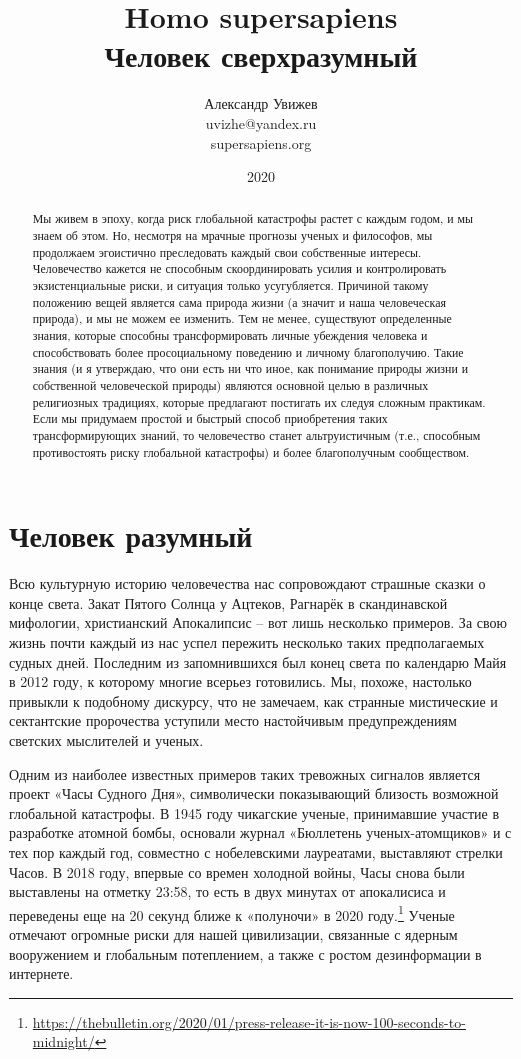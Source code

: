 \documentclass[12pt,a4paper]{report}
\title{%
	\textbf{Homo supersapiens}\\
	\large{Человек сверхразумный}}
\author{Александр Увижев\\
		uvizhe@yandex.ru\\
		supersapiens.org}
\date{2020}
\begin{document}
\maketitle

\begin{abstract}
Мы живем в эпоху, когда риск глобальной катастрофы растет с каждым годом, и мы знаем об этом. Но, несмотря на мрачные прогнозы ученых и философов, мы продолжаем эгоистично преследовать каждый свои собственные интересы. Человечество кажется не способным скоординировать усилия и контролировать экзистенциальные риски, и ситуация только усугубляется. Причиной такому положению вещей является сама природа жизни (а значит и наша человеческая природа), и мы не можем ее изменить. Тем не менее, существуют определенные знания, которые способны трансформировать личные убеждения человека и способствовать более просоциальному поведению и личному благополучию. Такие знания (и я утверждаю, что они есть ни что иное, как понимание природы жизни и собственной человеческой природы) являются основной целью в различных религиозных традициях, которые предлагают постигать их следуя сложным практикам. Если мы придумаем простой и быстрый способ приобретения таких трансформирующих знаний, то человечество станет альтруистичным (т.е., способным противостоять риску глобальной катастрофы) и более благополучным сообществом.
\end{abstract}

\chapter*{Человек разумный}

Всю культурную историю человечества нас сопровождают страшные сказки о конце света. Закат Пятого Солнца у Ацтеков, Рагнарёк в скандинавской мифологии, христианский Апокалипсис -- вот лишь несколько примеров. За свою жизнь почти каждый из нас успел пережить несколько таких предполагаемых судных дней. Последним из запомнившихся был конец света по календарю Майя в 2012 году, к которому многие всерьез готовились. Мы, похоже, настолько привыкли к подобному дискурсу, что не замечаем, как странные мистические и сектантские пророчества уступили место настойчивым предупреждениям светских мыслителей и ученых.

\noindent Одним из наиболее известных примеров таких тревожных сигналов является проект «Часы Судного Дня», символически показывающий близость возможной глобальной катастрофы. В 1945 году чикагские ученые, принимавшие участие в разработке атомной бомбы, основали журнал «Бюллетень ученых-атомщиков» и с тех пор каждый год, совместно с нобелевскими лауреатами, выставляют стрелки Часов. В 2018 году, впервые со времен холодной войны, Часы снова были выставлены на отметку 23:58, то есть в двух минутах от апокалисиса и переведены еще на 20 секунд ближе к «полуночи» в 2020 году.\footnote{\url{https://thebulletin.org/2020/01/press-release-it-is-now-100-seconds-to-midnight/}} Ученые отмечают огромные риски для нашей цивилизации, связанные с ядерным вооружением и глобальным потеплением, а также с ростом дезинформации в интернете.
\end{document}
